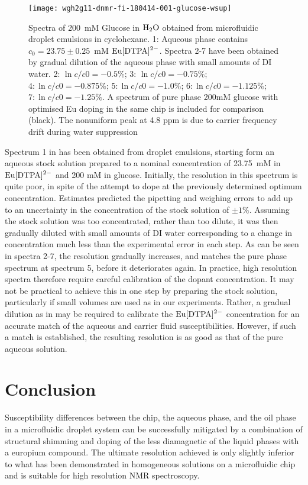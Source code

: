 \begin{figure}
\begin{center}
	\texttt{[image: wgh2g11-dnmr-fi-180414-001-glucose-wsup]}
\end{center}
\caption{Spectra of 200~mM Glucose in $\ce{H_2O}$ obtained from microfluidic droplet emulsions in
	cyclohexane. 1: Aqueous phase contains $c_0=23.75\pm0.25$~mM $\ce{Eu[DTPA]^{2-}}$. Spectra 2-7
	have been obtained by gradual dilution of the aqueous phase with small amounts of DI water.
	2: $\ln c/c0 = -0.5\%$; 3: $\ln c/c0 = -0.75\%$; $4: \ln c/c0 = -0.875\%$;
	$5: \ln c/c0 = -1.0\%$; $6: \ln c/c0 = -1.125\%$; $7: \ln c/c0 = -1.25\%$. A spectrum of pure phase 200mM glucose
	with optimised Eu doping in the same chip is included for comparison (black). The nonuniform peak at 4.8 ppm is due to carrier frequency drift during water suppression }
\label{fig:glucose-dilution}
\end{figure}

Spectrum 1 in  has been obtained from
droplet emulsions, starting form an aqueous stock solution prepared to a nominal concentration
of 23.75~mM in $\ce{Eu[DTPA]^{2-}}$ and 200 mM in glucose.
Initially, the resolution in this spectrum is quite poor, in spite of
the attempt to dope at the previously determined optimum concentration. Estimates predicted
the pipetting and weighing errors to add up to an uncertainty in the concentration of the
stock solution of $\pm 1\%$.
Assuming the stock solution was too concentrated, rather than too dilute, it was
then gradually diluted with small amounts of DI water corresponding
to a change in concentration much less than the experimental error in each step.
As can be seen in spectra 2-7, the resolution gradually increases, and matches
the pure phase spectrum at spectrum 5, before it deteriorates again.
In practice, high resolution spectra therefore require careful calibration of the dopant
concentration. It may not be practical to achieve this in one step by preparing the stock
solution, particularly if small volumes are used as in our
experiments. Rather, a gradual dilution as in  may be required
to calibrate the $\ce{Eu[DTPA]^{2-}}$ concentration for an accurate match of
the aqueous and carrier fluid susceptibilities. However, if such a match is established,
the resulting resolution is as good as that of the pure aqueous solution.

\section{Conclusion}

Susceptibility differences between the chip,
the aqueous phase, and the oil phase in a microfluidic droplet system can
be successfully mitigated by a combination of structural shimming and
doping of the less diamagnetic of the liquid phases with a europium compound.
The ultimate resolution achieved is only slightly inferior to what has been
demonstrated in homogeneous solutions on a microfluidic chip and is suitable for high
resolution NMR spectroscopy.

